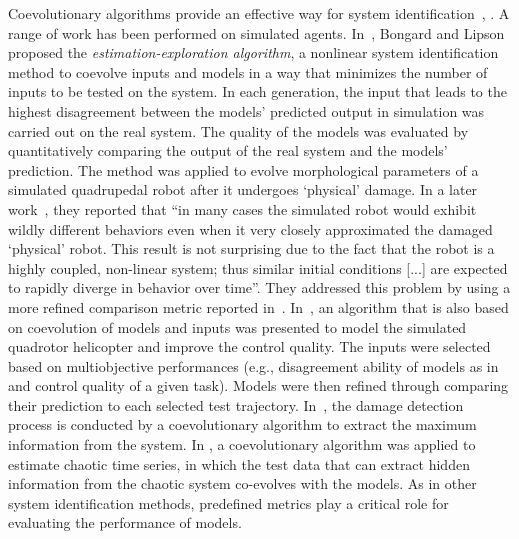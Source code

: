 Coevolutionary algorithms provide an effective way for system identification~\cite{Bongard2005}, \cite{Bongard_remote_robot_2004,Bongard_function_recovery_2004,Koos2009,Bongard2007PNAS,Mirm2011,Ly2014}. A range of work has been performed on simulated agents. In~\cite{Bongard_remote_robot_2004}, Bongard and Lipson proposed the \emph{estimation-exploration algorithm}, a nonlinear system identification method to coevolve inputs and models in a way that minimizes the number of inputs to be tested on the system. In each generation, the input that leads to the highest disagreement between the models' predicted output in simulation was carried out on the real system. The quality of the models was evaluated by quantitatively comparing the output of the real system and the models' prediction. The method was applied to evolve morphological parameters of a simulated quadrupedal robot after it undergoes `physical' damage. In a later work~\cite{Bongard_function_recovery_2004}, they reported that ``in many cases the simulated robot would exhibit wildly different behaviors even when it very closely approximated the damaged `physical' robot. This result is not surprising due to the fact that the robot is a highly coupled, non-linear system; thus similar initial conditions [...] are expected to rapidly diverge in behavior over time''. They addressed this problem by using a more refined comparison metric reported in~\cite{Bongard_function_recovery_2004}. In~\cite{Koos2009}, an algorithm that is also based on coevolution of models and inputs was presented to model the simulated quadrotor helicopter and improve the control quality. The inputs were selected based on multiobjective performances (e.g., disagreement ability of models as in ~\cite{Bongard_remote_robot_2004} and control quality of a given task). Models were then refined through comparing their prediction to each selected test trajectory. In~\cite{Kouchmeshky_2007}, the damage detection process is conducted by a coevolutionary algorithm to extract the maximum information from the system. In \cite{Mirmomeni_2011}, a coevolutionary algorithm was applied to estimate chaotic time series, in which the test data that can extract hidden information from the chaotic system co-evolves with the models. As in other system identification methods, predefined metrics play a critical role for evaluating the performance of models. 
  
